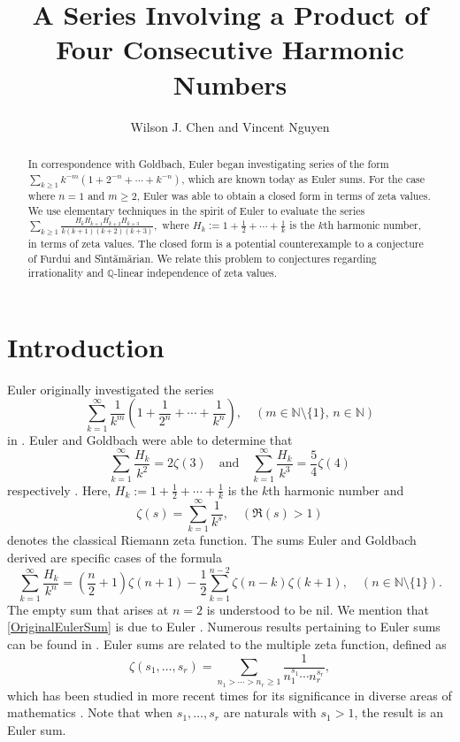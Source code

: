 \documentclass[10pt]{amsart}
\title{A Series Involving a Product of Four Consecutive Harmonic Numbers}
\author{Wilson J. Chen and Vincent Nguyen}
\theoremstyle{definition}
\begin{document}
\begin{abstract}
    In correspondence with Goldbach, Euler began investigating series of the form
    $\sum_{k \geq 1} k^{-m}\left(1 + 2^{-n} + \cdots + k^{-n}\right)$, which are known today as Euler sums. For the case where $n=1$ and $m \geq 2$, Euler was able to obtain a closed form in terms of zeta values. We use elementary techniques in the spirit of Euler to evaluate the series $\sum_{k \geq 1} \frac{H_k H_{k+1} H_{k+2} H_{k+3}}{k(k+1)(k+2)(k+3)},$ where $H_k := 1 + \frac{1}{2} + \cdots + \frac{1}{k}$ is the $k$th harmonic number, in terms of zeta values. The closed form is a potential counterexample to a conjecture of Furdui and S{\^\i}nt{\u{a}}m{\u{a}}rian. We relate this problem to conjectures regarding irrationality and $\mathbb{Q}$-linear independence of zeta values.
\end{abstract}

\maketitle

\section{Introduction}
Euler originally investigated the series
$$\sum_{k=1}^\infty \frac{1}{k^m}\left(1 + \frac{1}{2^n} + \cdots + \frac{1}{k^n}\right), \quad (m\in \mathbb{N}\setminus\{1\}, \,n \in \mathbb{N})$$
in \cite{Euler1}. Euler and Goldbach were able to determine that
\begin{equation} \label{EulerGoldbach}
    \sum_{k=1}^\infty \frac{H_k}{k^2} = 2\zeta(3) \quad \text{and} \quad \sum_{k=1}^\infty \frac{H_k}{k^3} = \frac{5}{4}\zeta(4)
\end{equation}
respectively \cite[pp. 238–240]{SharpMathAnal}. Here, $H_k := 1 + \frac{1}{2} + \cdots + \frac{1}{k}$ is the $k$th harmonic number and
\begin{equation}\label{ZetaFunctionDef}
    \zeta(s) = \sum_{k=1}^\infty \frac{1}{k^s}, \quad (\Re(s) > 1)
\end{equation}
denotes the classical Riemann zeta function. The sums Euler and Goldbach derived are specific cases of the formula
\begin{equation} \label{OriginalEulerSum}
    \sum_{k=1}^\infty \frac{H_k}{k^n} = \left(\frac{n}{2} + 1\right)\zeta(n+1) - \frac{1}{2}\sum_{k=1}^{n-2} \zeta(n-k)\zeta(k+1), \quad (n \in \mathbb{N}\setminus\{1\}).
\end{equation}
The empty sum that arises at $n=2$ is understood to be nil. We mention that \eqref{OriginalEulerSum} is due to Euler \cite{ExplicitEulerSum, AssociatedFun}. Numerous results pertaining to Euler sums can be found in \cite{ExplicitEulerSum, FlajoletEuler, Sofo, LogIntHarmSeriesBook, Xu,XuEuler, XuEulerSums2, XuEulerSums3, XuEulerSums4}. Euler sums are related to the multiple zeta function, defined as
$$\zeta(s_1, \ldots, s_r) = \sum_{n_1 > \cdots > n_r \geq 1} \frac{1}{n_1^{s_1} \cdots n_r^{s_r}},$$
which has been studied in more recent times for its significance in diverse areas of mathematics \cite{CombAlgMZV,AlgebraMZV, ZhaoMZV}. Note that when $s_1, \ldots, s_r$ are naturals with $s_1>1$, the result is an Euler sum.
\end{document}
